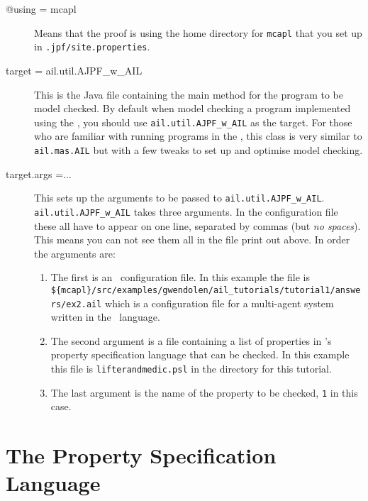 \begin{sloppypar}
\begin{description}
\item[@using = mcapl] Means that the proof is using the home directory for \texttt{mcapl} that you set up in \texttt{.jpf/site.properties}.
\item[target = ail.util.AJPF\_w\_AIL] This is the Java file containing the main method for the program to be model checked.  By default when model checking a program implemented using the \ail, you should use \texttt{ail.util.AJPF\_w\_AIL} as the target.  For those who are familiar with running programs in the \ail, this class is very similar to \texttt{ail.mas.AIL} but with a few tweaks to set up and optimise model checking.
\item[target.args =...] This sets up the arguments to be passed to \texttt{ail.util.AJPF\_w\_AIL}.  \texttt{ail.util.AJPF\_w\_AIL} takes three arguments.  In the configuration file these all have to appear on one line, separated by commas (but \emph{no spaces}).  This means you can not see them all in the file print out above.  In order the arguments are:
\begin{enumerate}
\item The first is an \ail\ configuration  file.  In this example the file is \texttt{\$\{mcapl\}/src/examples/gwendolen/ail\_tutorials/tutorial1/answers/ex2.ail} which is a configuration file for a multi-agent system written in the \gwendolen\ language.
\item The second argument is a file containing a list of properties in \ajpf's property specification language that can be checked.  In this example this file is \texttt{lifterandmedic.psl} in the directory for this tutorial.
\item The last argument is the name of the property to be checked, \texttt{1} in this case.
\end{enumerate}
\end{description}
\end{sloppypar}

\section{The Property Specification Language}

